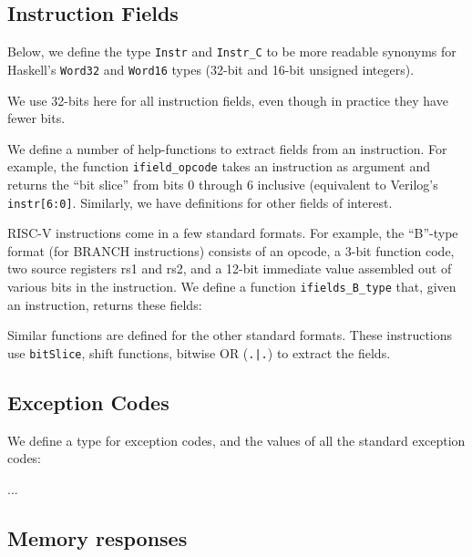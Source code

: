 \documentclass[11pt]{article}
\begin{document}
\subsection{Instruction Fields}

Below, we define the type {\tt Instr} and {\tt Instr\_C} to be more
readable synonyms for Haskell's {\tt Word32} and {\tt Word16} types
(32-bit and 16-bit unsigned integers).

We use 32-bits here for all instruction fields, even though
in practice they have fewer bits.



We define a number of help-functions to extract fields from an
instruction.  For example, the function {\tt ifield\_opcode} takes an
instruction as argument and returns the ``bit slice'' from bits 0
through 6 inclusive (equivalent to Verilog's {\tt instr[6:0]}.
Similarly, we have definitions for other fields of interest.



RISC-V instructions come in a few standard formats.  For example, the
``B''-type format (for BRANCH instructions) consists of an opcode, a
3-bit function code, two source registers rs1 and rs2, and a 12-bit
immediate value assembled out of various bits in the instruction.  We
define a function \verb|ifields_B_type| that, given an instruction,
returns these fields:



Similar functions are defined for the other standard formats.  These
instructions use \verb|bitSlice|, shift functions, bitwise OR
(\verb/.|./) to extract the fields.


\subsection{Exception Codes}

We define a type for exception codes, and the values of all the standard exception codes:



...




\subsection{Memory responses}
\end{document}

